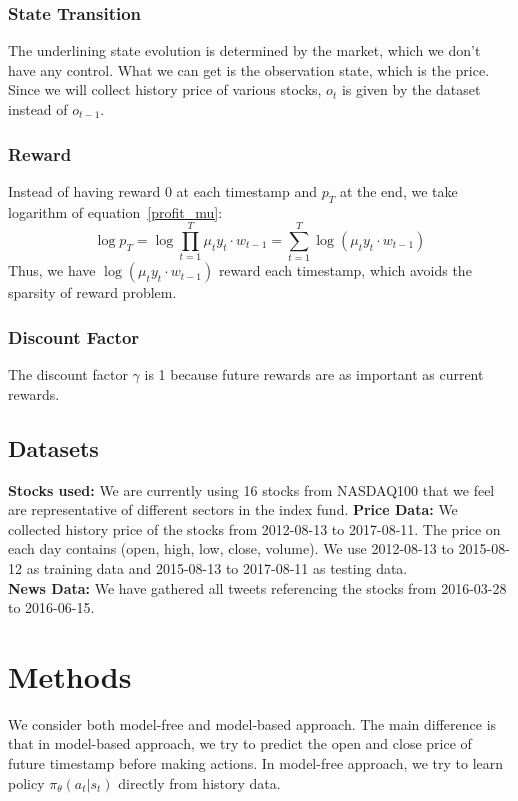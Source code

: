 \documentclass[a4paper, 10pt]{article}
\begin{document}
\begin{spacing}{1.2}
    \subsubsection{State Transition}
    The underlining state evolution is determined by the market, which we don't have any control. What we can get is the observation state, which is the price. Since we will collect history price of various stocks, $o_t$ is given by the dataset instead of $o_{t-1}$.\\
    \subsubsection{Reward}
    Instead of having reward 0 at each timestamp and $p_T$ at the end, we take logarithm of equation~\ref{profit_mu}:
    \begin{equation}
    \log{p_T}=\log{\prod_{t=1}^{T}\mu_t y_t\cdot w_{t-1}}=\sum_{t=1}^{T}\log(\mu_t y_t\cdot w_{t-1})
    \end{equation}
    Thus, we have $\log(\mu_t y_t\cdot w_{t-1})$ reward each timestamp, which avoids the sparsity of reward problem.\\
    \subsubsection{Discount Factor}
    The discount factor $\gamma$ is 1 because future rewards are as important as current rewards.
    
    \subsection{Datasets}
    \textbf{Stocks used:}
    We are currently using 16 stocks from NASDAQ100 that we feel are representative of different sectors in the index fund. 
    \textbf{Price Data:}
    We collected history price of the stocks from 2012-08-13 to 2017-08-11. The price on each day contains (open, high, low, close, volume). We use 2012-08-13 to 2015-08-12 as training data and 2015-08-13 to 2017-08-11 as testing data.\\
    \textbf{News Data:}
    We have gathered all tweets referencing the stocks from 2016-03-28 to 2016-06-15. 
    \section{Methods}
    We consider both model-free and model-based approach. The main difference is that in model-based approach, we try to predict the open and close price of future timestamp before making actions. In model-free approach, we try to learn policy $\pi_{\theta}(a_t|s_t)$ directly from history data.

\end{spacing}
\end{document}
